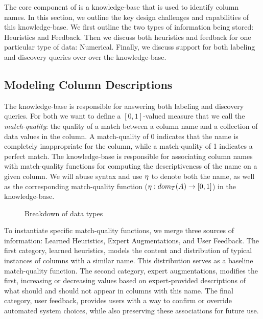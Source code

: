 
The core component of \systemname is a knowledge-base that is used to identify column names.
In this section, we outline the key design challenges and capabilities of this knowledge-base.  
We first outline the two types of information being stored: Heuristics and Feedback.
Then we discuss both heuristics and feedback for one particular type of data: Numerical.  
Finally, we discuss support for both labeling and discovery queries over over the knowledge-base.

\subsection{Modeling Column Descriptions}

The \systemname knowledge-base is responsible for answering both labeling and discovery queries.
For both we want to define a $[0,1]$-valued measure that we call the \emph{match-quality}: the quality of a match between a column name and a collection of data values in the column.
A match-quality of 0 indicates that the name is completely inappropriate for the column, while a match-quality of 1 indicates a perfect match.  
The \systemname knowledge-base is responsible for associating column names with match-quality functions for computing the descriptiveness of the name on a given column.
We will abuse syntax and use $\eta$ to denote both the name, as well as the corresponding match-quality function ($\eta : dom_T(A) \rightarrow [0,1]$) in the knowledge-base.

\begin{figure}
\caption{Breakdown of data types}
\label{fig:type-breakdown}
\end{figure}

To instantiate specific match-quality functions, we merge three sources of information: Learned Heuristics, Expert Augmentations, and User Feedback. 
The first category, learned heuristics, models the content and distribution of typical instances of columns with a similar name.
This distribution serves as a baseline match-quality function.
The second category, expert augmentations, modifies the first, increasing or decreasing values based on expert-provided descriptions of what should and should not appear in columns with this name.
The final category, user feedback, provides users with a way to confirm or override automated system choices, while also preserving these associations for future use.

